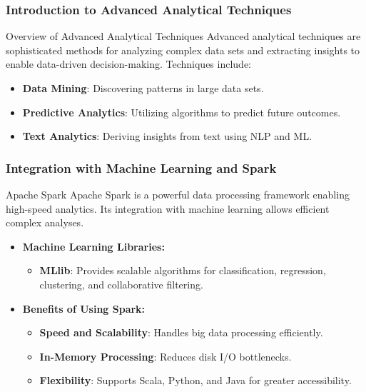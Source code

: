 \documentclass[aspectratio=169]{beamer}
\begin{document}
\frame{\titlepage}

\begin{frame}[fragile]
    \maketitle
\end{frame}

\begin{frame}[fragile]
    \frametitle{Introduction to Advanced Analytical Techniques}
    
    \begin{block}{Overview of Advanced Analytical Techniques}
        Advanced analytical techniques are sophisticated methods for analyzing complex data sets and extracting insights to enable data-driven decision-making. Techniques include:
    \end{block}
    
    \begin{itemize}
        \item \textbf{Data Mining}: Discovering patterns in large data sets.
        \item \textbf{Predictive Analytics}: Utilizing algorithms to predict future outcomes.
        \item \textbf{Text Analytics}: Deriving insights from text using NLP and ML.
    \end{itemize}
\end{frame}

\begin{frame}[fragile]
    \frametitle{Integration with Machine Learning and Spark}
    
    \begin{block}{Apache Spark}
        Apache Spark is a powerful data processing framework enabling high-speed analytics. Its integration with machine learning allows efficient complex analyses.
    \end{block}
    
    \begin{itemize}
        \item \textbf{Machine Learning Libraries:}
        \begin{itemize}
            \item \textbf{MLlib}: Provides scalable algorithms for classification, regression, clustering, and collaborative filtering.
        \end{itemize}
        
        \item \textbf{Benefits of Using Spark:}
        \begin{itemize}
            \item \textbf{Speed and Scalability}: Handles big data processing efficiently.
            \item \textbf{In-Memory Processing}: Reduces disk I/O bottlenecks.
            \item \textbf{Flexibility}: Supports Scala, Python, and Java for greater accessibility.
        \end{itemize}
    \end{itemize}
\end{frame}
\end{document}
